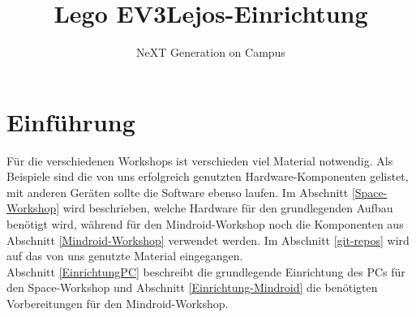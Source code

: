 \documentclass[
	ngerman,
	accentcolor=1c,%
	]{tudapub}
\begin{document}




\title{Lego EV3\newline Lejos-Einrichtung}
\subtitle{NeXT Generation on Campus}
\date{}





\maketitle


\newpage


\tableofcontents

\section{Einf\"uhrung}
F\"ur die verschiedenen Workshops ist verschieden viel Material notwendig. Als Beispiele sind die von uns erfolgreich genutzten Hardware-Komponenten gelistet, mit anderen Ger\"aten sollte die Software ebenso laufen.\newline
Im Abschnitt \ref{Space-Workshop} wird beschrieben, welche Hardware f\"ur den grundlegenden Aufbau ben\"otigt wird, w\"ahrend f\"ur den Mindroid-Workshop noch die Komponenten aus Abschnitt \ref{Mindroid-Workshop} verwendet werden.\newline
Im Abschnitt \ref{git-repos} wird auf das von uns genutzte Material eingegangen.\\
Abschnitt \ref{EinrichtungPC} beschreibt die grundlegende Einrichtung des PCs f\"ur den Space-Workshop und Abschnitt \ref{Einrichtung-Mindroid} die ben\"otigten Vorbereitungen f\"ur den Mindroid-Workshop.
\end{document}
